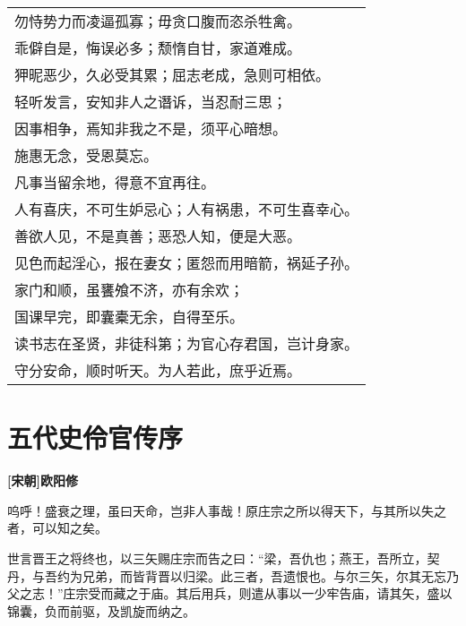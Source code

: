 \documentclass[UTF8,titlepage,oneside]{ctexbook}
\begin{document}
\begin{center}
\begin{tabular}{l}
		
		勿恃势力而凌逼孤寡；毋贪口腹而恣杀牲禽。\\
		
		
		乖僻自是，悔误必多；颓惰自甘，家道难成。\\
		
		
		狎昵恶少，久必受其累；屈志老成，急则可相依。\\
		
		
		轻听发言，安知非人之谮诉，当忍耐三思；\\
		
		
		因事相争，焉知非我之不是，须平心暗想。\\
		
		
		施惠无念，受恩莫忘。\\
		
		
		凡事当留余地，得意不宜再往。\\
		
		
		人有喜庆，不可生妒忌心；人有祸患，不可生喜幸心。\\
		
		
		善欲人见，不是真善；恶恐人知，便是大恶。\\
		
		
		见色而起淫心，报在妻女；匿怨而用暗箭，祸延子孙。\\
		
		
		家门和顺，虽饔飧不济，亦有余欢；\\
		
		
		国课早完，即囊橐无余，自得至乐。\\
		
		
		读书志在圣贤，非徒科第；为官心存君国，岂计身家。\\
		
		
		守分安命，顺时听天。为人若此，庶乎近焉。\\
		
	\end{tabular}
\end{center}


\chapter*{五代史伶官传序}
\begin{center}
	\textbf{[宋朝]欧阳修}
\end{center}

呜呼！盛衰之理，虽曰天命，岂非人事哉！原庄宗之所以得天下，与其所以失之者，可以知之矣。


世言晋王之将终也，以三矢赐庄宗而告之曰：“梁，吾仇也；燕王，吾所立，契丹，与吾约为兄弟，而皆背晋以归梁。此三者，吾遗恨也。与尔三矢，尔其无忘乃父之志！”庄宗受而藏之于庙。其后用兵，则遣从事以一少牢告庙，请其矢，盛以锦囊，负而前驱，及凯旋而纳之。
\end{document}
